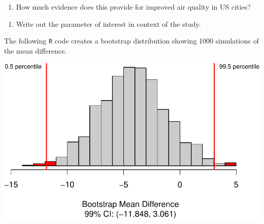 \documentclass[
]{report}
\newenvironment{Shaded}{\begin{snugshade}}{\end{snugshade}}
\newcommand{\CommentTok}[1]{\textcolor[rgb]{0.56,0.35,0.01}{\textit{#1}}}
\newcommand{\DataTypeTok}[1]{\textcolor[rgb]{0.13,0.29,0.53}{#1}}
\newcommand{\DecValTok}[1]{\textcolor[rgb]{0.00,0.00,0.81}{#1}}
\newcommand{\FloatTok}[1]{\textcolor[rgb]{0.00,0.00,0.81}{#1}}
\newcommand{\KeywordTok}[1]{\textcolor[rgb]{0.13,0.29,0.53}{\textbf{#1}}}
\newcommand{\NormalTok}[1]{#1}
\newcommand{\OperatorTok}[1]{\textcolor[rgb]{0.81,0.36,0.00}{\textbf{#1}}}
\providecommand{\tightlist}{%
  \setlength{\itemsep}{0pt}\setlength{\parskip}{0pt}}
\begin{document}
\vspace{.8in}

\begin{enumerate}
\def\labelenumi{\arabic{enumi}.}
\setcounter{enumi}{16}
\tightlist
\item
  How much evidence does this provide for improved air quality in US cities?
\end{enumerate}

\vspace{.3in}

\begin{enumerate}
\def\labelenumi{\arabic{enumi}.}
\setcounter{enumi}{17}
\tightlist
\item
  Write out the parameter of interest in context of the study.
\end{enumerate}

\vspace{.6in}

The following \texttt{R} code creates a bootstrap distribution showing 1000 simulations of the mean difference.

\begin{Shaded}
\end{Shaded}

\begin{center}\includegraphics[width=0.7\linewidth]{08-paired_files/figure-latex/unnamed-chunk-5-1} \end{center}
\end{document}
